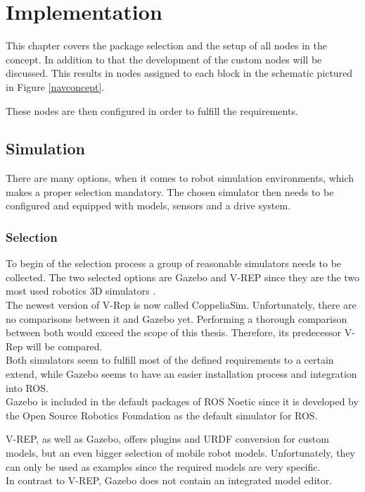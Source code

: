 \chapter{Implementation}
\label{Selection}

This chapter covers the package selection and the setup of all nodes in the concept. In addition to that the development of the custom nodes will be discussed. This results in nodes assigned to each block in the schematic pictured in Figure \ref{navconcept}.

These nodes are then configured in order to fulfill the requirements.

\section{Simulation}
There are many options, when it comes to robot simulation environments, which makes a proper selection mandatory. The chosen simulator then needs to be configured and equipped with models, sensors and a drive system.

\subsection{Selection}
To begin of the selection process a group of reasonable simulators needs to be collected. The two selected options are Gazebo and V-REP since they are the two most used robotics 3D simulators \cite{SimComp}.\\
The newest version of V-Rep is now called CoppeliaSim. Unfortunately, there are no comparisons between it and Gazebo yet. Performing a thorough comparison between both would exceed the scope of this thesis. Therefore, its predecessor V-Rep will be compared. \\

Both simulators seem to fulfill most of the defined requirements to a certain extend, while Gazebo seems to have an easier installation process and integration into ROS.\\
Gazebo is included in the default packages of ROS Noetic since it is developed by the Open Source Robotics Foundation as the default simulator for ROS\cite{ROSPkg}.

V-REP, as well as Gazebo, offers plugins and URDF conversion for custom models, but an even bigger selection of mobile robot models. Unfortunately, they can only be used as examples since the required models are very specific.\\
In contrast to V-REP, Gazebo does not contain an integrated model editor.

